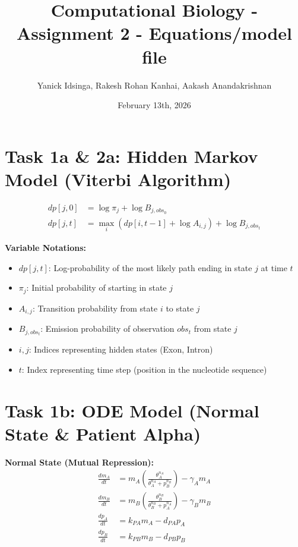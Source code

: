 \documentclass{article}
\title{Computational Biology - Assignment 2 - Equations/model file}
\author{Yanick Idsinga, Rakesh Rohan Kanhai, Aakash Anandakrishnan}
\date{February 13th, 2026}
\begin{document}
\maketitle



\section*{Task 1a \& 2a: Hidden Markov Model (Viterbi Algorithm)}

\begin{align}
    dp[j, 0] &= \log \pi_j + \log B_{j, obs_0} \\
    dp[j, t] &= \max_{i} \left( dp[i, t-1] + \log A_{i, j} \right) + \log B_{j, obs_t}
\end{align}

\textbf{Variable Notations:}
\begin{itemize}
    \item $dp[j, t]$: Log-probability of the most likely path ending in state $j$ at time $t$
    \item $\pi_j$: Initial probability of starting in state $j$
    \item $A_{i, j}$: Transition probability from state $i$ to state $j$
    \item $B_{j, obs_t}$: Emission probability of observation $obs_t$ from state $j$
    \item $i, j$: Indices representing hidden states (Exon, Intron)
    \item $t$: Index representing time step (position in the nucleotide sequence)
\end{itemize}

\section*{Task 1b: ODE Model (Normal State \& Patient Alpha)}

\textbf{Normal State (Mutual Repression):}
\begin{align}
    \frac{dm_A}{dt} &= m_A \left( \frac{\theta_A^{n_A}}{\theta_A^{n_A} + p_B^{n_B}} \right) - \gamma_A m_A \\
    \frac{dm_B}{dt} &= m_B \left( \frac{\theta_B^{n_B}}{\theta_B^{n_B} + p_A^{n_A}} \right) - \gamma_B m_B \\
    \frac{dp_A}{dt} &= k_{PA} m_A - d_{PA} p_A \\
    \frac{dp_B}{dt} &= k_{PB} m_B - d_{PB} p_B
\end{align}
\end{document}
